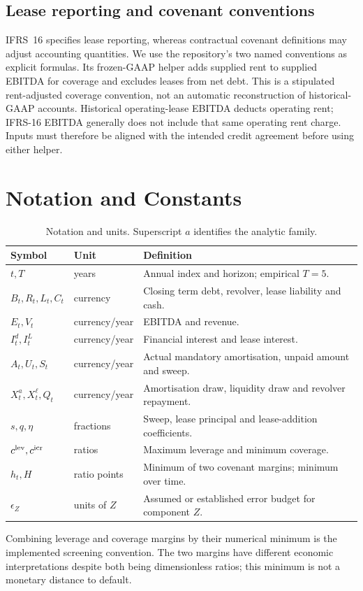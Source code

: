 \documentclass[11pt,a4paper]{article}
\theoremstyle{plain}
\theoremstyle{definition}
\begin{document}
\subsection{Lease reporting and covenant conventions}
IFRS~16 specifies lease reporting, whereas contractual covenant definitions may
adjust accounting quantities. We use the repository's two named conventions as
explicit formulas. Its frozen-GAAP helper adds supplied rent to supplied EBITDA
for coverage and excludes leases from net debt. This is a stipulated rent-adjusted
coverage convention, not an automatic reconstruction of historical-GAAP accounts.
Historical operating-lease EBITDA deducts operating rent; IFRS-16 EBITDA generally
does not include that same operating rent charge. Inputs must therefore be aligned
with the intended credit agreement before using either helper.

\section{Notation and Constants}
\begin{table}[H]
\centering\small
\caption{Notation and units. Superscript $a$ identifies the analytic family.}
\begin{tabularx}{\textwidth}{l l X}
\toprule Symbol & Unit & Definition\\\midrule
$t,T$ & years & Annual index and horizon; empirical $T=5$.\\
$B_t,R_t,L_t,C_t$ & currency & Closing term debt, revolver, lease liability and cash.\\
$E_t,V_t$ & currency/year & EBITDA and revenue.\\
$I_t^d,I_t^L$ & currency/year & Financial interest and lease interest.\\
$A_t,U_t,S_t$ & currency/year & Actual mandatory amortisation, unpaid amount and sweep.\\
$X_t^a,X_t^\ell,Q_t$ & currency/year & Amortisation draw, liquidity draw and revolver repayment.\\
$s,q,\eta$ & fractions & Sweep, lease principal and lease-addition coefficients.\\
$c^{\rm lev},c^{\rm icr}$ & ratios & Maximum leverage and minimum coverage.\\
$h_t,H$ & ratio points & Minimum of two covenant margins; minimum over time.\\
$\epsilon_Z$ & units of $Z$ & Assumed or established error budget for component $Z$.\\
\bottomrule\end{tabularx}
\end{table}
Combining leverage and coverage margins by their numerical minimum is the
implemented screening convention. The two margins have different economic
interpretations despite both being dimensionless ratios; this minimum is not a
monetary distance to default.
\end{document}
